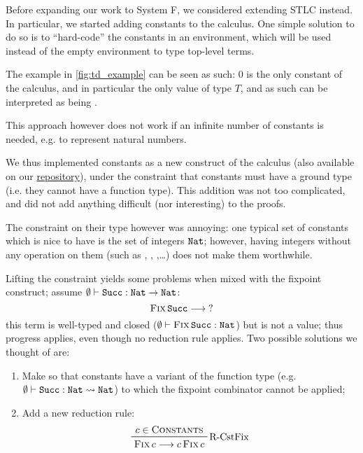 Before expanding our work to System F,
we considered extending STLC instead.
In particular, we started adding constants to the calculus.
One simple solution to do so is to ``hard-code'' the constants in an environment,
which will be used instead of the empty environment to type top-level terms.

The example in \cref{fig:td_example} can be seen as such:
0 is the only constant of the calculus, and in particular the only value of type $T$,
and as such can be interpreted as being .

This approach however does not work if an infinite number of constants is needed, 
e.g. to represent natural numbers.

We thus implemented constants as a new construct of the calculus 
(also available on our \href{\branchurl{constants}}{repository}),
under the constraint that constants must have a ground type 
(i.e. they cannot have a function type).
This addition was not too complicated, and did not add anything difficult (nor interesting) to the proofs.

The constraint on their type however was annoying: 
one typical set of constants which is nice to have is the set of integers $\texttt{Nat}$; 
however, having integers without any operation on them 
(such as , , ,\ldots{}) does not make them worthwhile.

Lifting the constraint yields some problems when mixed with the fixpoint construct;
assume $\emptyset{} \vdash{} \texttt{Succ} : {{\texttt{Nat}} \rightarrow{}{} {\texttt{Nat}}}$:
\[  {\textsc{Fix}}\,{\texttt{Succ}}  \longrightarrow{}{}  ?  \]
this term is well-typed and closed ($\emptyset{} \vdash{} {\textsc{Fix}}\,{\texttt{Succ}} : {\texttt{Nat}}$) 
but is not a value; thus progress applies, even though no reduction rule applies.
Two possible solutions we thought of are:
\begin{enumerate}
    \item Make so that constants have a variant of the function type 
    (e.g. $\emptyset{} \vdash{} \texttt{Succ} : {\texttt{Nat}\leadsto{}\texttt{Nat}}$)
    to which the fixpoint combinator cannot be applied;
    \item Add a new reduction rule:
    \[ \prftree[r]{R-CstFix}{c \in \lconstants}{\reduces{\fixpoint{c}}{\app{c}{\fixpoint{c}}}} \]
\end{enumerate}

